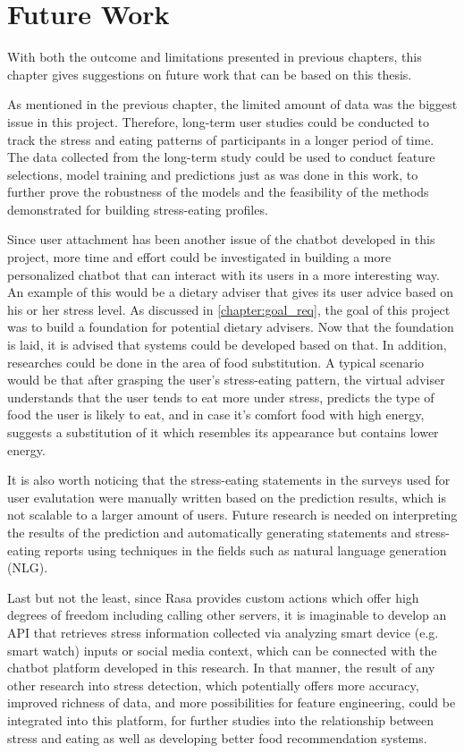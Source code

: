 
\chapter{Future Work}\label{chapter:future_work}
With both the outcome and limitations presented in previous chapters, this chapter gives suggestions on future work that can be based on this thesis.\bigskip

\noindent As mentioned in the previous chapter, the limited amount of data was the biggest issue in this project. Therefore, long-term user studies could be conducted to track the stress and eating patterns of participants in a longer period of time. The data collected from the long-term study could be used to conduct feature selections, model training and predictions just as was done in this work, to further prove the robustness of the models and the feasibility of the methods demonstrated for building stress-eating profiles.\bigskip

\noindent Since user attachment has been another issue of the chatbot developed in this project, more time and effort could be investigated in building a more personalized chatbot that can interact with its users in a more interesting way. An example of this would be a dietary adviser that gives its user advice based on his or her stress level. As discussed in \autoref{chapter:goal_req}, the goal of this project was to build a foundation for potential dietary advisers. Now that the foundation is laid, it is advised that systems could be developed based on that. In addition, researches could be done in the area of food substitution. A typical scenario would be that after grasping the user's stress-eating pattern, the virtual adviser understands that the user tends to eat more under stress, predicts the type of food the user is likely to eat, and in case it's comfort food with high energy, suggests a substitution of it which resembles its appearance but contains lower energy.\bigskip

\noindent It is also worth noticing that the stress-eating statements in the surveys used for user evalutation were manually written based on the prediction results, which is not scalable to a larger amount of users. Future research is needed on interpreting the results of the prediction and automatically generating statements and stress-eating reports using techniques in the fields such as natural language generation (NLG).\bigskip

\noindent Last but not the least, since Rasa provides custom actions which offer high degrees of freedom including calling other servers, it is imaginable to develop an API that retrieves stress information collected via analyzing smart device (e.g. smart watch) inputs or social media context, which can be connected with the chatbot platform developed in this research. In that manner, the result of any other research into stress detection, which potentially offers more accuracy, improved richness of data, and more possibilities for feature engineering, could be integrated into this platform, for further studies into the relationship between stress and eating as well as developing better food recommendation systems.
